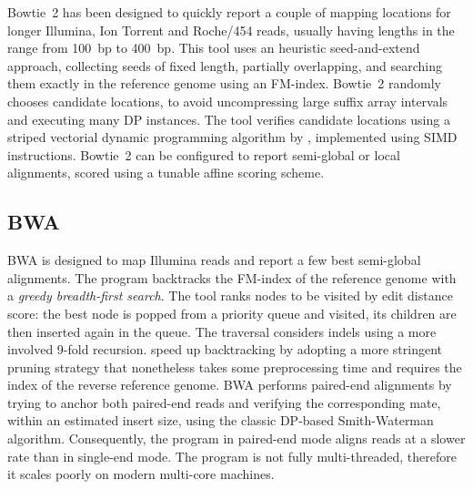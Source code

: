 Bowtie~2 \citep{Langmead2012} has been designed to quickly report a couple of mapping locations for longer Illumina, Ion Torrent and Roche/454 reads, usually having lengths in the range from 100~bp to 400~bp.
This tool uses an heuristic seed-and-extend approach, collecting seeds of fixed length, partially overlapping, and searching them exactly in the reference genome using an FM-index.
Bowtie~2 randomly chooses candidate locations, to avoid uncompressing large suffix array intervals and executing many DP instances.
The tool verifies candidate locations using a striped vectorial dynamic programming algorithm by \citep{Farrar2007}, implemented using SIMD instructions.
Bowtie~2 can be configured to report semi-global or local alignments, scored using a tunable affine scoring scheme.


\subsection{BWA}
\label{background:mappers:bwa}

BWA \citep{Li2009} is designed to map Illumina reads and report a few best semi-global alignments.
The program backtracks the FM-index of the reference genome with a \emph{greedy breadth-first search}.
The tool ranks nodes to be visited by edit distance score: the best node is popped from a priority queue and visited, its children are then inserted again in the queue.
The traversal considers indels using a more involved 9-fold recursion.
\citeauthor{Li2009} speed up backtracking by adopting a more stringent pruning strategy \citep{Maekinen2010} that nonetheless takes some preprocessing time and requires the index of the reverse reference genome.
BWA performs paired-end alignments by trying to anchor both paired-end reads and verifying the corresponding mate, within an estimated insert size, using the classic DP-based Smith-Waterman algorithm.
Consequently, the program in paired-end mode aligns reads at a slower rate than in single-end mode.
The program is not fully multi-threaded, therefore it scales poorly on modern multi-core machines.


